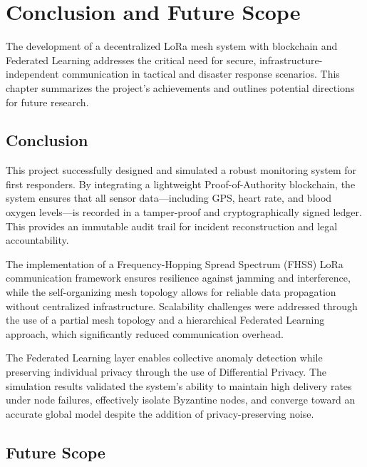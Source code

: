 \chapter{Conclusion and Future Scope}

The development of a decentralized LoRa mesh system with blockchain and Federated Learning addresses the critical need for secure, infrastructure-independent communication in tactical and disaster response scenarios. This chapter summarizes the project's achievements and outlines potential directions for future research.

\section{Conclusion}

This project successfully designed and simulated a robust monitoring system for first responders. By integrating a lightweight Proof-of-Authority blockchain, the system ensures that all sensor data—including GPS, heart rate, and blood oxygen levels—is recorded in a tamper-proof and cryptographically signed ledger. This provides an immutable audit trail for incident reconstruction and legal accountability.

The implementation of a Frequency-Hopping Spread Spectrum (FHSS) LoRa communication framework ensures resilience against jamming and interference, while the self-organizing mesh topology allows for reliable data propagation without centralized infrastructure. Scalability challenges were addressed through the use of a partial mesh topology and a hierarchical Federated Learning approach, which significantly reduced communication overhead.

The Federated Learning layer enables collective anomaly detection while preserving individual privacy through the use of Differential Privacy. The simulation results validated the system's ability to maintain high delivery rates under node failures, effectively isolate Byzantine nodes, and converge toward an accurate global model despite the addition of privacy-preserving noise.

\section{Future Scope}

